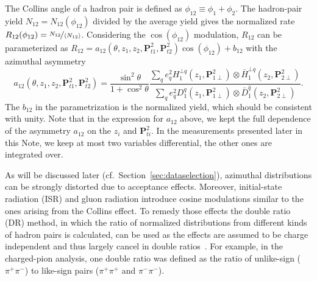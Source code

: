The Collins angle of a hadron pair is defined as $\phi_{12} \equiv \phi_1+\phi_2$. The hadron-pair yield $N_{12}=N_{12}(\phi_{12})$ divided by the average yield gives the normalized rate $R_{12}(\phi_{12})=\nicefrac{N_{12}}{\langle  N_{12}\rangle}$. Considering the $\cos(\phi_{12})$ modulation, $R_{12}$ can be parameterized as $R_{12}=a_{12}(\theta,z_1,z_2, \boldsymbol{P}^2_{t1},\boldsymbol{P}^2_{t2})\cos(\phi_{12})+b_{12}$ with the azimuthal asymmetry
\begin{equation}
a_{12}(\theta,z_1,z_2, \boldsymbol{P}^2_{t1},\boldsymbol{P}^2_{t2})=\frac{\sin^2\theta}{1+\cos^2\theta}
\frac{\sum\limits_{q}e^2_qH^{\bot q}_1(z_1,\boldsymbol{P}^2_{1\perp})\otimes \bar{H}^{\bot q}_1(z_2,\boldsymbol{P}^2_{2\perp})}{\sum\limits_{q}e^2_qD^q_1(z_1,\boldsymbol{P}^2_{1\perp})\otimes \bar{D}^{\bar{q}}_1(z_2,\boldsymbol{P}^2_{2\perp})}.
\end{equation} 
The $b_{12}$ in the parametrization is the normalized yield, which should be consistent with unity.
Note that in the expression for $a_{12}$ above, we kept the full dependence of the asymmetry $a_{12}$ on the $z_i$ and $ \boldsymbol{P}^2_{ti}$. In the measurements presented later in this Note, we keep at most two variables differential, the other ones are integrated over.

As will be discussed later (cf.~Section~\ref{sec:dataselection}),  azimuthal distributions can be strongly distorted due to acceptance effects. Moreover, initial-state radiation (ISR) and gluon radiation introduce cosine modulations similar to the ones arising from the Collins effect. To remedy those effects the double ratio (DR) method, in which the ratio of normalized distributions from different kinds of hadron pairs is calculated, can be used as the effects are assumed to be charge independent and thus largely cancel in double ratios~\cite{ChargedPionResult,CollinsInSIDISandEE}.  For example, in the charged-pion analysis, one double ratio was defined as the ratio of unlike-sign  ($\pi^+\pi^-$) to like-sign pairs ($\pi^+\pi^+$ and $\pi^-\pi^-$).


